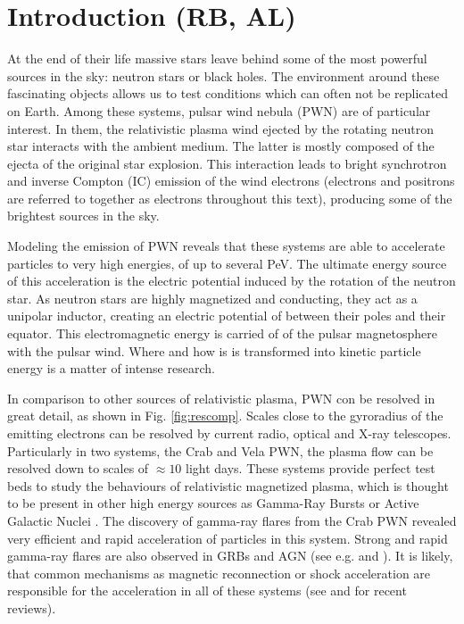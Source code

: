 \section{Introduction (RB, AL)}
At the end of their life massive stars leave behind some of the most powerful sources in the sky: neutron stars or black holes. The environment around these fascinating objects allows
us to test conditions which can often not be replicated on Earth. Among these systems, pulsar wind nebula (PWN) are of particular interest. In them, the relativistic plasma wind ejected by the rotating neutron star interacts with the ambient medium. The latter is mostly composed of the ejecta of the original star explosion. This interaction leads to bright synchrotron and inverse Compton (IC) emission of the wind electrons (electrons and positrons are referred to together as electrons throughout this text), producing some of the brightest sources in the sky.

Modeling the emission of PWN reveals that these systems are able to accelerate particles to very high energies, of up to several PeV. The ultimate energy source of this acceleration is the electric potential induced by the rotation of the neutron star. As neutron stars are highly magnetized and conducting, they act as a unipolar inductor, creating an electric potential of between their poles and their equator. This electromagnetic energy is carried of of the pulsar magnetosphere with the pulsar wind. Where and how is is transformed into kinetic particle energy is a matter of intense research.

In comparison to other sources of relativistic plasma, PWN con be resolved in great detail, as shown in Fig. \ref{fig:rescomp}. Scales close to the gyroradius of the emitting electrons can be resolved by current radio, optical and X-ray telescopes. Particularly in two systems, the Crab and Vela PWN, the plasma flow can be resolved down to scales of $\approx 10$ light days. These systems provide perfect test beds to study the behaviours of relativistic magnetized plasma, which is thought to be present in other high energy sources as Gamma-Ray Bursts or Active Galactic Nuclei \citep{Berger_2014,Massaro_2015}. The discovery of gamma-ray flares from the Crab PWN revealed very efficient and rapid acceleration of particles in this system. Strong and rapid gamma-ray flares are also observed in GRBs and AGN (see e.g. \citet{Ackermann_2013} and \citet{Aharonian_2009}). It is likely, that common mechanisms as magnetic reconnection or shock acceleration are responsible for the acceleration in all of these systems (see \citet{Kagan_2015} and \citet{Sironi_2015} for recent reviews).

